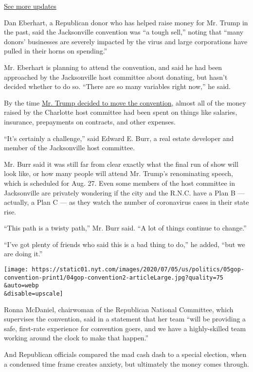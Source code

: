 \href{https://www.nytimes.com/2020/07/31/us/elections/biden-vs-trump.html?action=click\&pgtype=Article\&state=default\&region=MAIN_CONTENT_1\&context=storylines_live_updates}{See
more updates}

Dan Eberhart, a Republican donor who has helped raise money for Mr.
Trump in the past, said the Jacksonville convention was ``a tough
sell,'' noting that ``many donors' businesses are severely impacted by
the virus and large corporations have pulled in their horns on
spending.''

Mr. Eberhart is planning to attend the convention, and said he had been
approached by the Jacksonville host committee about donating, but hasn't
decided whether to do so. ``There are so many variables right now,'' he
said.

By the time
\href{https://www.nytimes.com/2020/06/06/us/politics/republican-convention-charlotte-2020.html}{Mr.
Trump decided to move the convention}, almost all of the money raised by
the Charlotte host committee had been spent on things like salaries,
insurance, prepayments on contracts, and other expenses.

``It's certainly a challenge,'' said Edward E. Burr, a real estate
developer and member of the Jacksonville host committee.

Mr. Burr said it was still far from clear exactly what the final run of
show will look like, or how many people will attend Mr. Trump's
renominating speech, which is scheduled for Aug. 27. Even some members
of the host committee in Jacksonville are privately wondering if the
city and the R.N.C. have a Plan B --- actually, a Plan C --- as they
watch the number of coronavirus cases in their state rise.

``This path is a twisty path,'' Mr. Burr said. ``A lot of things
continue to change.''

``I've got plenty of friends who said this is a bad thing to do,'' he
added, ``but we are doing it.''

\texttt{[image: https://static01.nyt.com/images/2020/07/05/us/politics/05gop-convention-print1/04gop-convention2-articleLarge.jpg?quality=75\\\&auto=webp\\\&disable=upscale]}

Ronna McDaniel, chairwoman of the Republican National Committee, which
supervises the convention, said in a statement that her team ``will be
providing a safe, first-rate experience for convention goers, and we
have a highly-skilled team working around the clock to make that
happen.''

And Republican officials compared the mad cash dash to a special
election, when a condensed time frame creates anxiety, but ultimately
the money comes through.

